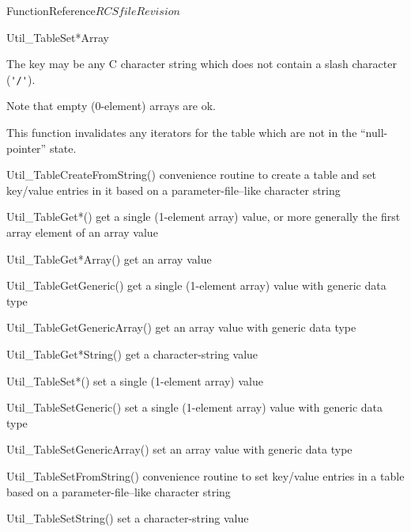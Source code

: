\begin{cactuspart}{FunctionReference}{$RCSfile$}{$Revision$}
\begin{FunctionDescription}{Util\_TableSet*Array}
\begin{Discussion}
The key may be any C character string which does not contain a slash
character (\verb|'/'|).

Note that empty (0-element) arrays are ok.

This function invalidates any iterators for the table which are
not in the ``null-pointer'' state.
\end{Discussion}

\begin{SeeAlsoSection}
\begin{SeeAlso}{Util\_TableCreateFromString()}
convenience routine to create a table and set key/value entries
in it based on a parameter-file--like character string
\end{SeeAlso}
\begin{SeeAlso}{Util\_TableGet*()}
get a single (1-element array) value,
or more generally the first array element of an array value
\end{SeeAlso}
\begin{SeeAlso}{Util\_TableGet*Array()}
get an array value
\end{SeeAlso}
\begin{SeeAlso}{Util\_TableGetGeneric()}
get a single (1-element array) value with generic data type
\end{SeeAlso}
\begin{SeeAlso}{Util\_TableGetGenericArray()}
get an array value with generic data type
\end{SeeAlso}
\begin{SeeAlso}{Util\_TableGet*String()}
get a character-string value
\end{SeeAlso}
\begin{SeeAlso}{Util\_TableSet*()}
set a single (1-element array) value
\end{SeeAlso}
\begin{SeeAlso}{Util\_TableSetGeneric()}
set a single (1-element array) value with generic data type
\end{SeeAlso}
\begin{SeeAlso}{Util\_TableSetGenericArray()}
set an array value with generic data type
\end{SeeAlso}
\begin{SeeAlso}{Util\_TableSetFromString()}
convenience routine to set key/value entries in a table based on a
parameter-file--like character string
\end{SeeAlso}
\begin{SeeAlso}{Util\_TableSetString()}
set a character-string value
\end{SeeAlso}
\end{SeeAlsoSection}


\end{FunctionDescription}
\end{cactuspart}
